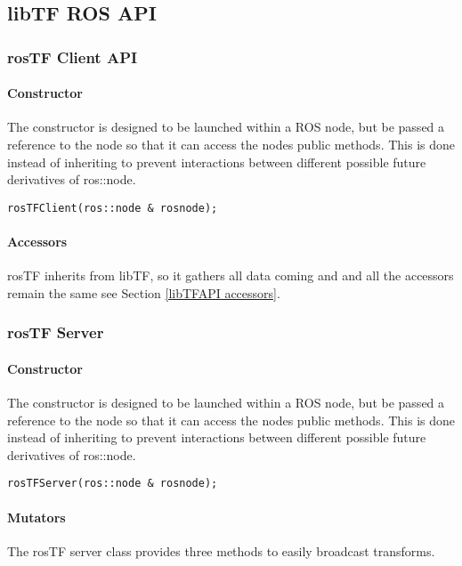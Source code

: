 \documentclass[12pt]{article}
\begin{document}
\subsection{libTF ROS API}

\subsubsection {rosTF Client API}
\paragraph {Constructor}
The constructor is designed to be launched within a ROS node, but be passed a reference to 
the node so that it can access the nodes public methods.  This is done instead of inheriting
to prevent interactions between different possible future derivatives of ros::node. 
\begin{verbatim}
rosTFClient(ros::node & rosnode);
\end{verbatim}

\paragraph {Accessors}
rosTF inherits from libTF, so it gathers all data coming and 
and all the accessors remain the same see Section \ref{libTFAPI accessors}.


\subsubsection{rosTF Server}
\paragraph {Constructor}
The constructor is designed to be launched within a ROS node, but be passed a reference to 
the node so that it can access the nodes public methods.  This is done instead of inheriting
to prevent interactions between different possible future derivatives of ros::node. 
\begin{verbatim}
rosTFServer(ros::node & rosnode);
\end{verbatim}

\paragraph {Mutators}
The rosTF server class provides three methods to easily broadcast transforms.  
\end{document}
